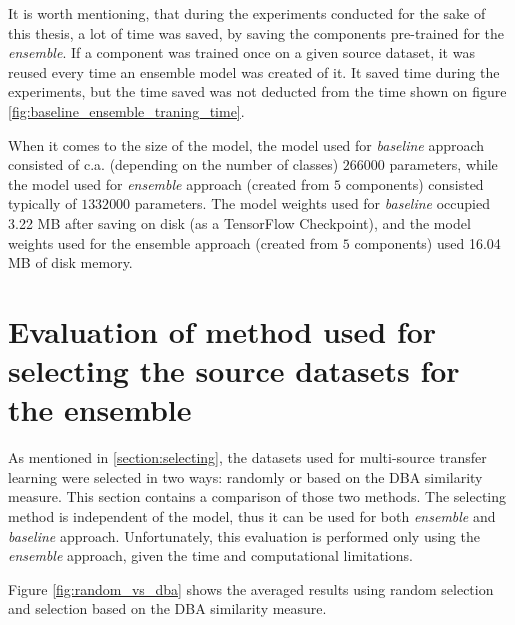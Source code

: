 \documentclass[a4paper,11pt,twoside]{report}
\theoremstyle{definition}
\begin{document}
\FloatBarrier
It is worth mentioning, that during the experiments conducted for the sake of this thesis, a lot of time was saved, by saving the components pre-trained for the \textit{ensemble}. If a component was trained once on a given source dataset, it was reused every time an ensemble model was created of it. It saved time during the experiments, but the time saved was not deducted from the time shown on figure \ref{fig:baseline_ensemble_traning_time}.

When it comes to the size of the model, the model used for \textit{baseline} approach consisted of c.a. (depending on the number of classes) $266 000$ parameters, while the model used for \textit{ensemble} approach (created from $5$ components) consisted typically of $1 332 000$ parameters. The model weights used for \textit{baseline} occupied 3.22 MB after saving on disk (as a TensorFlow Checkpoint), and the model weights used for the ensemble approach (created from $5$ components) used 16.04 MB of disk memory.

\section{Evaluation of method used for selecting the source datasets for the ensemble}
As mentioned in \ref{section:selecting}, the datasets used for multi-source transfer learning were selected in two ways: randomly or based on the DBA similarity measure. This section contains a comparison of those two methods. The selecting method is independent of the model, thus it can be used for both \textit{ensemble} and \textit{baseline} approach. Unfortunately, this evaluation is performed only using the \textit{ensemble} approach, given the time and computational limitations.

Figure \ref{fig:random_vs_dba} shows the averaged results using random selection and selection based on the DBA similarity measure.
\end{document}
